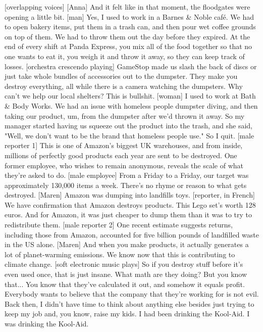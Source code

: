 \documentclass[a4paper]{article}
\begin{document}
	[overlapping voices]
	[Anna] And it felt like in that moment, the floodgates were opening a little bit.
	[man] Yes, I used to work in a Barnes \& Noble café.
	We had to open bakery items,
	put them in a trash can,
	and then pour wet coffee grounds on top of them.
	We had to throw them out the day before they expired.
	At the end of every shift at Panda Express,
	you mix all of the food together so that no one wants to eat it,
	you weigh it and throw it away,
	so they can keep track of losses.
	[orchestra crescendo playing]
	GameStop made us slash the back of discs
	or just take whole bundles of accessories out to the dumpster.
	They make you destroy everything,
	all while there is a camera watching the dumpsters.
	Why can't we help our local shelters? This is bullshit.
	[woman] I used to work at Bath \& Body Works.
	We had an issue with homeless people dumpster diving,
	and then taking our product,
	um, from the dumpster after we'd thrown it away.
	So my manager started having us
	squeeze out the product into the trash,
	and she said, "Well, we don't want to be the brand that homeless people use."
	So I quit.
	[male reporter 1] This is one of Amazon's biggest UK warehouses,
	and from inside, millions of perfectly good products each year
	are sent to be destroyed.
	One former employee, who wishes to remain anonymous,
	reveals the scale
	of what they're asked to do.
	[male employee] From a Friday to a Friday,
	our target was approximately 130,000 items a week.
	There's no rhyme or reason to what gets destroyed.
	[Maren] Amazon was dumping
	into landfills toys.
	[reporter, in French] We have confirmation that Amazon destroys products.
	This Lego set's worth 128 euros.
	And for Amazon, it was just cheaper to dump them
	than it was to try to redistribute them.
	[male reporter 2] One recent estimate suggests
	returns, including those from Amazon,
	accounted for five billion pounds of landfilled waste in the US alone.
	[Maren] And when you make products,
	it actually generates a lot of planet-warming emissions.
	We know now that this is contributing to climate change.
	[soft electronic music plays]
	So if you destroy stuff before it's even used once,
	that is just insane.
	What math are they doing?
	But you know that... You know that they've calculated it out,
	and somehow it equals profit.
	Everybody wants to believe
	that the company that they're working for is not evil.
	Back then, I didn't have time to think about anything else
	besides just trying to keep my job and, you know, raise my kids.
	I had been drinking the Kool-Aid. I was drinking the Kool-Aid.
\end{document}
